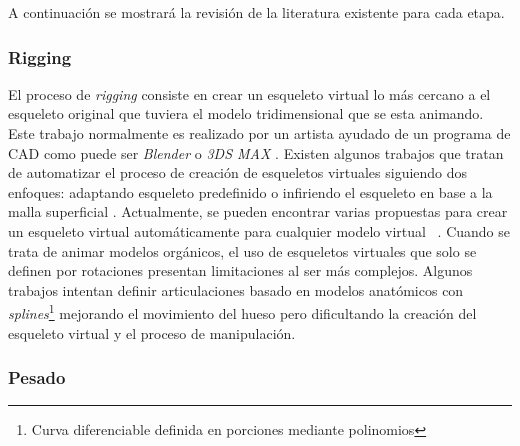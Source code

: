 A continuación se mostrará la revisión de la literatura existente para cada etapa.
\subsubsection{Rigging}
\label{art:rigging}

El proceso de \emph{rigging} consiste en crear un esqueleto virtual lo más cercano a el esqueleto original que tuviera el modelo tridimensional que se esta animando. Este trabajo normalmente es realizado por un artista ayudado de un programa de \ac{CAD} como puede ser \emph{Blender} \cite{blender} o \emph{3DS MAX} \cite{3ds}. 
Existen algunos trabajos que tratan de automatizar el proceso de creación de esqueletos virtuales siguiendo dos enfoques: adaptando esqueleto predefinido \cite{huang2013robust} o infiriendo el esqueleto en base a la malla superficial \cite{jacobson2014part}.
Actualmente, se pueden encontrar varias propuestas para crear un esqueleto virtual automáticamente para cualquier modelo virtual ~\cite{borosan2012rigmesh,feng2014fast,avril2016animation}.
Cuando se trata de animar modelos orgánicos, el uso de esqueletos virtuales que solo se definen por rotaciones presentan limitaciones al ser más complejos. Algunos trabajos intentan definir articulaciones basado en modelos anatómicos \cite{joints} con \emph{splines}\footnote{ Curva diferenciable definida en porciones mediante polinomios} mejorando el movimiento del hueso pero dificultando la creación del esqueleto virtual y el proceso de manipulación.



\subsubsection{Pesado}
\label{art:pesado}

